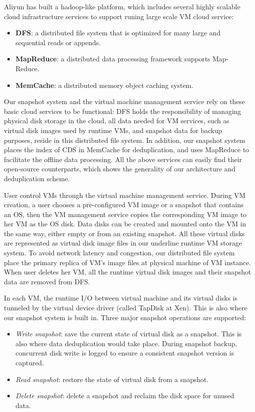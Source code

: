 Aliyun has built a hadoop-like platform, which includes
several highly scalable cloud infrastructure services to support
 runing large scale VM cloud service:
\begin{itemize}
\item \textbf{DFS}: a distributed file system that is optimized for many large and sequential reads or appends.
\item \textbf{MapReduce}: a distributed data processing framework supports Map-Reduce\cite{Dean2004}.
\item \textbf{MemCache}: a distributed memory object caching system.
\end{itemize}
Our snapshot system and the virtual machine management service rely on these basic cloud services
to be functional:
DFS holds the responsibility of managing physical disk storage
in the cloud, all data needed for VM services, such as virtual disk images used by runtime VMs,
and snapshot data for backup purposes, reside in this distributed file system. 
In addition, our snapshot system 
places the index of CDS in MemCache for deduplication, 
and uses MapReduce to facilitate the offline
data processing. All the above services can easily find their open-source counterparts,
which shows the generality of our architecture and deduplication scheme.

User control VMs through the virtual machine management service.
During VM creation, a user chooses a pre-configured VM image or
a snapshot that contains an OS,
then the VM management service 
copies the corresponding VM image to her VM as the OS disk.
Data disks can be created and mounted onto the VM in the same way,
either empty or from an existing snapshot. 
All these virtual disks are represented as virtual disk image files in our
underline runtime VM storage system.  
To avoid network latency and congestion, 
our distributed file system place the primary replica of VM's 
image files at physical machine of VM instance.
When user deletes her VM, all the runtime virtual disk images and
their snapshot data are removed from DFS.

In each VM, 
the runtime I/O between virtual machine and its virtual
disks is tunneled by the virtual device driver (called TapDisk\cite{Warfield2005} at Xen).
This is also where our snapshot system is built in. Three major snapshot operations are supported:
\begin{itemize}
\item \textit{Write snapshot}: save the current state of virtual disk as a snapshot.
This is also where data deduplication would take place.
During snapshot backup, concurrent disk write is logged 
to ensure a consistent snapshot version is captured. 
\item \textit{Read snapshot}: restore the state of virtual disk from a snapshot.
\item \textit{Delete snapshot}: delete a snapshot and reclaim the disk space for unused data.
\end{itemize}

